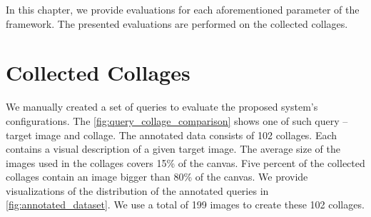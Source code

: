 In this chapter, we provide evaluations for each aforementioned parameter of the framework. The presented evaluations are performed on the collected collages.

\section{Collected Collages}

We manually created a set of queries to evaluate the proposed system's configurations. The \autoref{fig:query_collage_comparison} shows one of such query -- target image and collage. The annotated data consists of 102 collages. Each contains a visual description of a given target image. The average size of the images used in the collages covers 15\% of the canvas. Five percent of the collected collages contain an image bigger than 80\% of the canvas. We provide visualizations of the distribution of the annotated queries in  \autoref{fig:annotated_dataset}. We use a total of 199 images to create these 102 collages.

